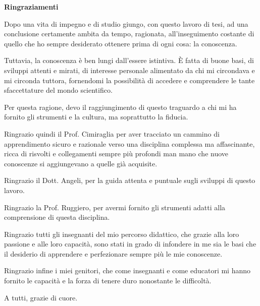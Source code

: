 \pagebreak
\thispagestyle{empty}

{ \Large \textbf{Ringraziamenti}}
\vspace{6mm}

Dopo una vita di impegno e di studio giungo, con questo lavoro di tesi,
ad una conclusione certamente ambita da tempo, ragionata, all'inseguimento
costante di quello che ho sempre desiderato ottenere prima di ogni cosa:
la conoscenza.

Tuttavia, la conoscenza \`e ben lungi dall'essere istintiva. \`E fatta di
buone basi, di sviluppi attenti e mirati, di interesse personale alimentato
da chi mi circondava e mi circonda tuttora, fornendomi la possibilit\`a di
accedere e comprendere le tante sfaccettature del mondo scientifico.

Per questa ragione, devo il raggiungimento di questo traguardo a chi mi ha
fornito gli strumenti e la cultura, ma soprattutto la fiducia.

Ringrazio quindi il Prof. Cimiraglia per aver tracciato un cammino di
apprendimento sicuro e razionale verso una disciplina complessa ma
affascinante, ricca di risvolti e collegamenti sempre pi\`u profondi
man mano che nuove conoscenze si aggiungevano a quelle gi\`a acquisite.

Ringrazio il Dott. Angeli, per la guida attenta e puntuale sugli sviluppi di
questo lavoro.

Ringrazio la Prof. Ruggiero, per avermi fornito gli strumenti adatti alla
comprensione di questa disciplina.

Ringrazio tutti gli insegnanti del mio percorso didattico, che grazie alla
loro passione e alle loro capacit\`a, sono stati in grado di infondere in me
sia le basi che il desiderio di apprendere e perfezionare sempre pi\`u le mie
conoscenze.

Ringrazio infine i miei genitori, che come insegnanti e come educatori mi
hanno fornito le capacit\`a e la forza di tenere duro nonostante le
difficolt\`a.

A tutti, grazie di cuore.


